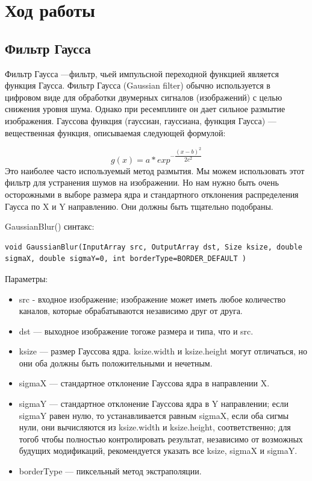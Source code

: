 \documentclass[14pt,a4paper,report]{report}
\begin{document}
\clearpage

\section{Ход работы}

\subsection{Фильтр Гаусса}
Фильтр Гаусса —фильтр, чьей импульсной переходной функцией является функция Гаусса. Фильтр Гаусса (Gaussian filter) обычно используется в цифровом виде для обработки двумерных сигналов (изображений) с целью снижения уровня шума. Однако при ресемплинге он дает сильное размытие изображения. 
Гауссова функция (гауссиан, гауссиана, функция Гаусса) — вещественная функция, описываемая следующей формулой:

$$ g(x) = a*exp^{-\dfrac{(x-b)^2}{2c^2}} $$
Это наиболее часто используемый метод размытия. Мы можем использовать этот фильтр для устранения шумов на изображении. Но нам нужно быть очень осторожными в выборе размера ядра и стандартного отклонения распределения Гаусса по X и Y направлению. Они должны быть тщательно подобраны.

GaussianBlur() синтакс:

\begin{lstlisting}
void GaussianBlur(InputArray src, OutputArray dst, Size ksize, double sigmaX, double sigmaY=0, int borderType=BORDER_DEFAULT )
\end{lstlisting}
Параметры:
\begin{itemize}
\item src - входное изображение; изображение может иметь любое количество каналов, которые обрабатываются независимо друг от друга.

\item dst — выходное изображение тогоже размера и типа, что и src.

\item ksize — размер Гауссова ядра. ksize.width и ksize.height могут отличаться, но они оба должны быть положительными и нечетным. 

\item sigmaX — стандартное отклонение Гауссова ядра в направлении X.

\item sigmaY — стандартное отклонение Гауссова ядра в Y направлении; если sigmaY равен нулю, то устанавливается равным sigmaX, если оба сигмы нули, они вычисляются из ksize.width и ksize.height, соответственно; для тогоб чтобы полностью контролировать результат, независимо от возможных будущих модификаций, рекомендуется указать все ksize, sigmaX и sigmaY.

\item borderType — пиксельный метод экстраполяции.
\end{itemize}
\end{document}
